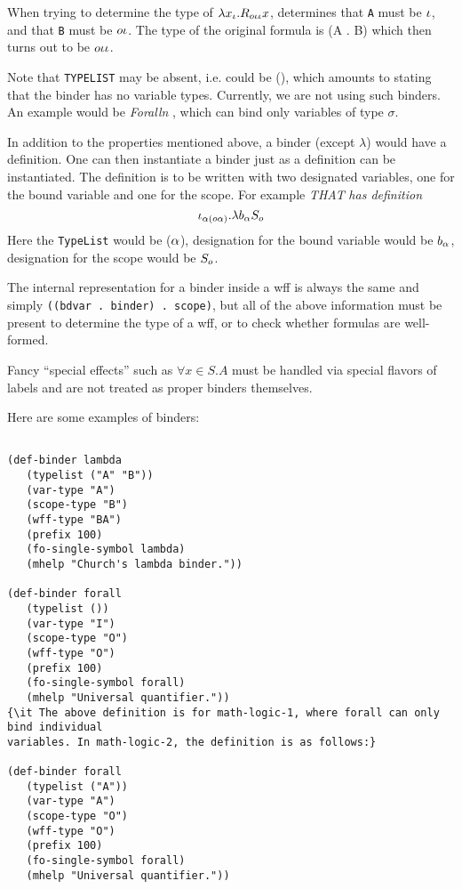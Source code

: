 When trying to determine the type of 
$\lambda x_\iota . R_{o\iota\iota} x$,
\TPS determines that {\tt A} must be $\iota$, and that {\tt B} must be $o\iota$.
The type of the original formula is {\wt (A . B)} which then turns out to
be $o\iota\iota$.

Note that {\tt TYPELIST} may be absent, i.e.  could be {\wt ()}, which
amounts to stating that the binder has no variable types.  Currently, we
are not using such binders.  An example would be {\it Foralln} , which can
bind only variables of type $\sigma$.

In addition to the properties mentioned above, a binder (except $\lambda$)
would have a definition.  One can then instantiate a binder just as a 
definition can be instantiated.  The definition is to be written with
two designated variables, one for the bound variable and one for the scope.
For example 
{\it THAT} {\it has definition}
$$\iota_{\alpha(o\alpha)} . \lambda b_\alpha S_o$$
Here the {\tt TypeList} would be ($\alpha$), designation for the bound
variable would be $b_\alpha$, designation for the scope would be
$S_o$.

The internal representation for a binder inside a wff is always the
same and simply {\tt ((bdvar .  binder) .  scope)}, but all of the above
information must be present to determine the type of a wff, or to check
whether formulas are well-formed.

Fancy ``special effects'' such as 
$\forall x\in S . A$
must be handled
via special flavors of labels and are not treated as proper binders themselves.

Here are some examples of binders:
\begin{verbatim}

(def-binder lambda
   (typelist ("A" "B"))
   (var-type "A")
   (scope-type "B")
   (wff-type "BA")
   (prefix 100)
   (fo-single-symbol lambda)
   (mhelp "Church's lambda binder."))

(def-binder forall
   (typelist ())
   (var-type "I")
   (scope-type "O")
   (wff-type "O")
   (prefix 100)
   (fo-single-symbol forall)
   (mhelp "Universal quantifier."))
{\it The above definition is for math-logic-1, where forall can only bind individual 
variables. In math-logic-2, the definition is as follows:}

(def-binder forall
   (typelist ("A"))
   (var-type "A")
   (scope-type "O")
   (wff-type "O")
   (prefix 100)
   (fo-single-symbol forall)
   (mhelp "Universal quantifier."))
\end{verbatim}

